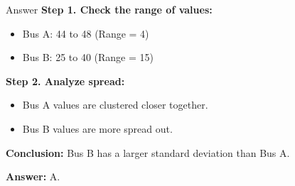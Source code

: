 \documentclass{beamer}
\begin{document}
\begin{frame}{Answer}
\textbf{Step 1. Check the range of values:}
\begin{itemize}
    \item Bus A: 44 to 48 (Range = 4)
    \item Bus B: 25 to 40 (Range = 15)
\end{itemize}

\textbf{Step 2. Analyze spread:}
\begin{itemize}
    \item Bus A values are clustered closer together.
    \item Bus B values are more spread out.
\end{itemize}

\textbf{Conclusion:}
Bus B has a larger standard deviation than Bus A.

\textbf{Answer:} A.
\end{frame}
\end{document}
